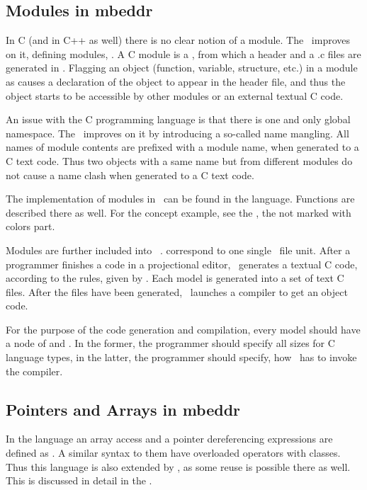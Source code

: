 \subsection{Modules in mbeddr}
\label{mbdrmodules}

In C (and in C++ as well) there is no clear notion of a module. The \mbp\ improves on it, defining 
modules, \cite{Voelter:MoDELS:2010}. A C module is a , from which a header and a .c files are generated in \mbdr.
Flagging an object (function, variable, structure, etc.) in a module as  causes a declaration of the object to appear
in the header file, and thus the object starts to be accessible by other modules or an external textual C code.

An issue with the C programming language is that there is one and only global namespace. The \mbp\ improves on it 
by introducing a so-called name mangling. All names of module contents are prefixed with a module name,
when generated to a C text code. Thus two objects with a same name but from different modules do
not cause a name clash when generated to a C text code.

The implementation of modules in \mbdr\ can be found in the  language. Functions are described there as well.
For the  concept example, see the , the not marked with colors part.

Modules are further included into \jbmps\ .  correspond to one single \jbmps\ file unit.
After a programmer finishes a code in a projectional editor, \jbmps\ generates a textual C code, 
according to the rules, given by \mbdr. Each model is generated into a set of text C files.
After the files have been generated, \mbdr\ launches a compiler to get an object code.

For the purpose of the code generation and compilation, every model should have a node of  
and  . In the former, the programmer should specify all sizes for C language types, 
in the latter, the programmer should specify, how  \mbdr\ has to invoke the compiler.

\subsection{Pointers and Arrays in mbeddr}

In the  language an array access and a pointer dereferencing expressions are defined as .
A similar syntax to them have overloaded operators with classes. Thus this language is also extended by \pcpp,
as some reuse is possible there as well. This is discussed in detail in the .







